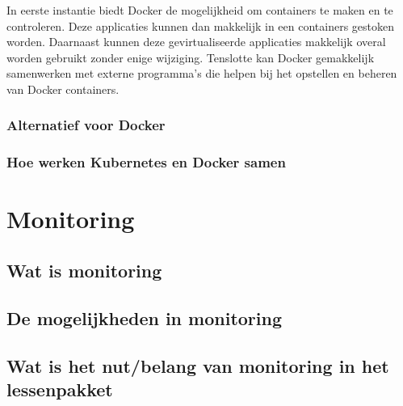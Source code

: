 In eerste instantie biedt Docker de mogelijkheid om containers te maken en te controleren. Deze applicaties kunnen dan makkelijk in een containers gestoken worden. Daarnaast kunnen deze gevirtualiseerde applicaties makkelijk overal worden gebruikt zonder enige wijziging. Tenslotte kan Docker gemakkelijk samenwerken met externe programma's die helpen bij het opstellen en beheren van Docker containers. \autocite{Rad2017}

\subsubsection{Alternatief voor Docker}
\subsubsection{Hoe werken Kubernetes en Docker samen}

\section{Monitoring}
\subsection{Wat is monitoring}

\subsection{De mogelijkheden in monitoring}
\subsection{Wat is het nut/belang van monitoring in het lessenpakket}

